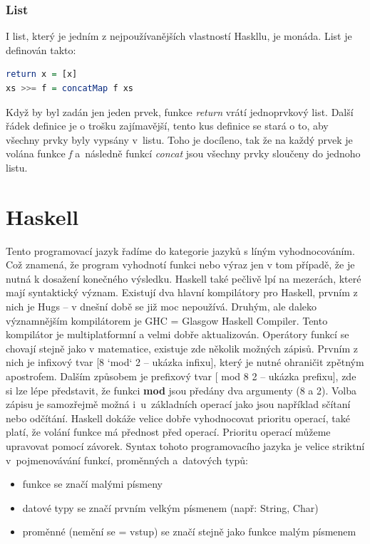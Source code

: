 \documentclass[12pt,a4paper]{report}
\begin{document}
\subsubsection{List}
I list, který je jedním z nejpoužívanějších vlastností Haskllu, je monáda. List je definován takto:
\begin{lstlisting}[language=Haskell, caption={Definice List}, captionpos=b,]
return x = [x]
xs >>= f = concatMap f xs 
\end{lstlisting}
Když by byl zadán jen jeden prvek, funkce \textit{return} vrátí jednoprvkový list. Další řádek definice je o trošku zajímavější, tento kus definice se stará o to, aby všechny prvky byly vypsány v~listu. Toho je docíleno, tak že na každý prvek je volána funkce \textit{f} a~následně funkcí \textit{concat} jsou všechny prvky sloučeny do jednoho listu.  

\section{Haskell}
Tento programovací jazyk řadíme do kategorie jazyků s líným vyhodnocováním.\cite{haskell} Což znamená, že program vyhodnotí funkci nebo výraz jen v tom případě, že je nutná k dosažení konečného výsledku. Haskell také pečlivě lpí na mezerách, které mají syntaktický význam. Existují dva hlavní kompilátory pro Haskell, prvním z nich je Hugs -- v dnešní době se již moc nepoužívá. Druhým, ale daleko významnějším kompilátorem je GHC = Glasgow Haskell Compiler. Tento kompilátor je multiplatformní a velmi dobře aktualizován. Operátory funkcí se chovají stejně jako v matematice, existuje zde několik možných zápisů. Prvním z nich je infixový tvar [8 `mod` 2 -- ukázka infixu], který je nutné ohraničit zpětným apostrofem. Dalším způsobem je prefixový tvar [ mod 8 2 -- ukázka prefixu], zde si lze lépe představit, že funkci \textbf{mod} jsou předány dva argumenty (8 a 2). Volba zápisu je samozřejmě možná i~u~základních operací jako jsou například sčítaní nebo odčítání. Haskell dokáže velice dobře vyhodnocovat prioritu operací, také platí, že volání funkce má přednost před operací. Prioritu operací můžeme upravovat pomocí závorek. Syntax tohoto programovacího jazyka je velice striktní v~pojmenovávání funkcí, proměnných a~datových typů:
\begin{itemize}
\item funkce se značí malými písmeny 
\item datové typy se značí prvním velkým písmenem (např: String, Char)
\item proměnné (nemění se = vstup) se značí stejně jako funkce malým písmenem
\end{itemize}
\end{document}
